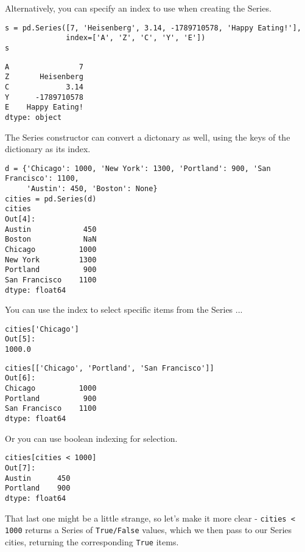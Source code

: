 \documentclass[KSmain.tex]{subfiles}
\begin{document}
Alternatively, you can specify an index to use when creating the Series.

\begin{framed}
\begin{verbatim}
s = pd.Series([7, 'Heisenberg', 3.14, -1789710578, 'Happy Eating!'],
              index=['A', 'Z', 'C', 'Y', 'E'])
s
\end{verbatim}
\end{framed}
\begin{verbatim}
A                7
Z       Heisenberg
C             3.14
Y      -1789710578
E    Happy Eating!
dtype: object
\end{verbatim}

The Series constructor can convert a dictonary as well, using the keys of the dictionary as its index.

\begin{framed}
\begin{verbatim}
d = {'Chicago': 1000, 'New York': 1300, 'Portland': 900, 'San Francisco': 1100,
     'Austin': 450, 'Boston': None}
cities = pd.Series(d)
cities
Out[4]:
Austin            450
Boston            NaN
Chicago          1000
New York         1300
Portland          900
San Francisco    1100
dtype: float64
\end{verbatim}
\end{framed}
You can use the index to select specific items from the Series ...

\begin{framed}
\begin{verbatim}
cities['Chicago']
Out[5]:
1000.0
\end{verbatim}
\end{framed}

\begin{framed}
\begin{verbatim}
cities[['Chicago', 'Portland', 'San Francisco']]
Out[6]:
Chicago          1000
Portland          900
San Francisco    1100
dtype: float64
\end{verbatim}
\end{framed}
Or you can use boolean indexing for selection.

\begin{framed}
\begin{verbatim}
cities[cities < 1000]
Out[7]:
Austin      450
Portland    900
dtype: float64
\end{verbatim}
\end{framed}
That last one might be a little strange, so let's make it more clear - \texttt{cities < 1000} returns a Series of \texttt{True/False} values, which we then pass to our Series cities, returning the corresponding \texttt{True} items.
\end{document}
